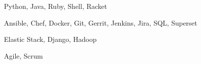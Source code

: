 \documentclass{newresume}
\begin{document}
\smallskip


\begin{description}[style=nextline,leftmargin=8em,topsep=1pt]
	\item[Languages] Python, Java, Ruby, Shell, Racket
	\item[Tools] Ansible, Chef, Docker, Git, Gerrit, Jenkins, Jira, SQL, Superset
	\item[Frameworks] Elastic Stack, Django, Hadoop
	\item[Methodologies] Agile, Scrum
\end{description}





%




\end{document}
